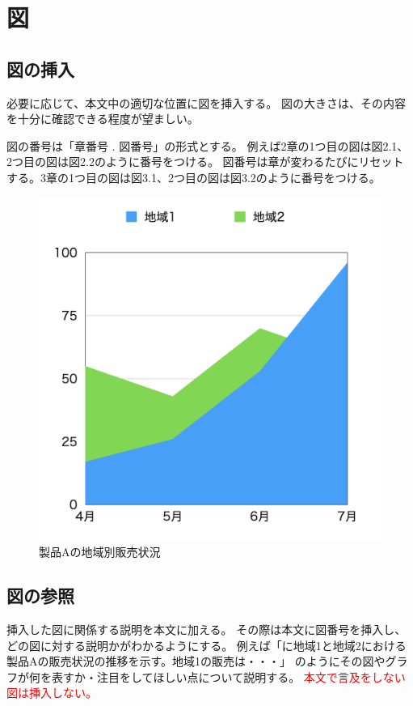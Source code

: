 \chapter{図}

\section{図の挿入}

必要に応じて、本文中の適切な位置に図を挿入する。
図の大きさは、その内容を十分に確認できる程度が望ましい。

図の番号は「章番号 . 図番号」の形式とする。
例えば2章の1つ目の図は図2.1、2つ目の図は図2.2のように番号をつける。
図番号は章が変わるたびにリセットする。3章の1つ目の図は図3.1、2つ目の図は図3.2のように番号をつける。

\begin{figure}[htbp]
  \centering
  \includegraphics[width=0.5\linewidth]{fig/chart1.png}
  \caption{製品Aの地域別販売状況}
  \label{fig:chart1}
\end{figure}

\section{図の参照}

挿入した図に関係する説明を本文に加える。
その際は本文に図番号を挿入し、どの図に対する説明かがわかるようにする。
例えば「に地域1と地域2における製品Aの販売状況の推移を示す。地域1の販売は・・・」
のようにその図やグラフが何を表すか・注目をしてほしい点について説明する。
\textcolor{red}{本文で言及をしない図は挿入しない。}

